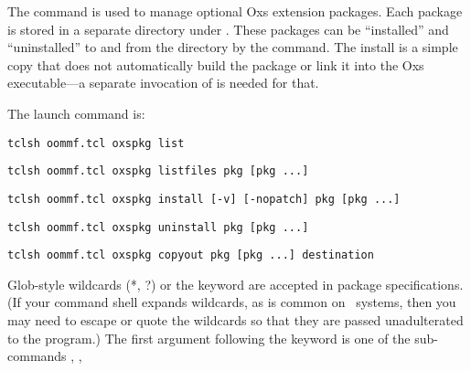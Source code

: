 The  command is used to manage optional Oxs extension
packages.  Each package is stored in a separate directory under
.  These packages can be ``installed'' and
``uninstalled'' to and from the  directory by
the  command.  The install is a simple copy that does not
automatically build the package or link it into the Oxs executable---a
separate invocation of
is needed for that.

The  launch command is:
\begin{description}
\addtolength{\itemsep}{-0.9\baselineskip}
\item[\latex{\hphantom{\textbf{or}}\hspace{1ex}}]\hspace*{1ex}\latex{\\[-\baselineskip]}
\verb+tclsh oommf.tcl oxspkg list+
\item[\textbf{or}\hspace{1ex}]\hspace*{1ex}\latex{\\[-0.4\baselineskip]}
\verb+tclsh oommf.tcl oxspkg listfiles pkg [pkg ...]+
\item[\textbf{or}\hspace{1ex}]\hspace*{1ex}\latex{\\[-0.4\baselineskip]}
\verb+tclsh oommf.tcl oxspkg install [-v] [-nopatch] pkg [pkg ...]+
\item[\textbf{or}\hspace{1ex}]\hspace*{1ex}\latex{\\[-0.4\baselineskip]}
\verb+tclsh oommf.tcl oxspkg uninstall pkg [pkg ...]+
\item[\textbf{or}\hspace{1ex}]\hspace*{1ex}\latex{\\[-0.4\baselineskip]}
\verb+tclsh oommf.tcl oxspkg copyout pkg [pkg ...] destination+
\end{description}
Glob-style wildcards (*, ?) or the keyword  are accepted in
package specifications.  (If your command shell expands wildcards, as
is common on \Unix\ systems, then you may need to escape or quote the
wildcards so that they are passed unadulterated to the 
program.)  The first argument following the 
keyword is one of the sub-commands , ,
